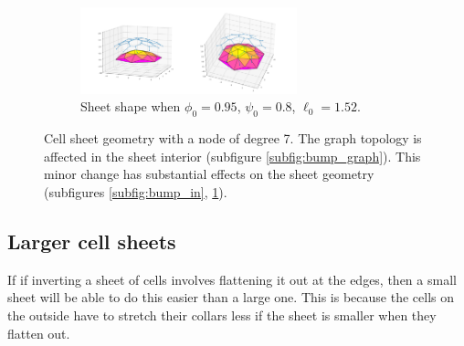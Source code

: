 \begin{figure}[htbp]
\begin{subfigure}[b]{\textwidth}
        \includegraphics[width=0.69\textwidth]{bump/bump0.95_0.8_1.52_10_plot.png}
        \caption{Sheet shape when $\phi_0=0.95$, $\psi_0=0.8$, $\ell_0=1.52$.}
        \label{subfig:bump_out}
    \end{subfigure}
    \caption{Cell sheet geometry with a node of degree 7. The graph topology is affected in the sheet interior (subfigure \ref{subfig:bump_graph}). This minor change has substantial effects on the sheet geometry (subfigures \ref{subfig:bump_in}, \ref{subfig:bump_out}).}
    \label{fig:bump}
\end{figure}

\subsection{Larger cell sheets}

If if inverting a sheet of cells involves flattening it out at the edges, then a small sheet will be able to do this easier than a large one. This is because the cells on the outside have to stretch their collars less if the sheet is smaller when they flatten out. 

